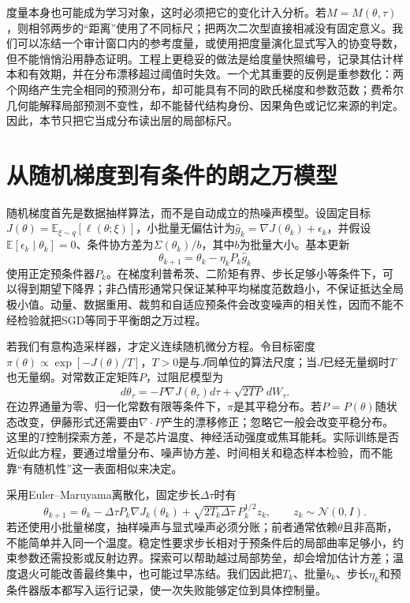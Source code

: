 度量本身也可能成为学习对象，这时必须把它的变化计入分析。若$M=M(\theta,\tau)$，则相邻两步的“距离”使用了不同标尺；把两次二次型直接相减没有固定意义。我们可以冻结一个审计窗口内的参考度量，或使用把度量演化显式写入的协变导数，但不能悄悄沿用静态证明。工程上更稳妥的做法是给度量快照编号，记录其估计样本和有效期，并在分布漂移超过阈值时失效。一个尤其重要的反例是重参数化：两个网络产生完全相同的预测分布，却可能具有不同的欧氏梯度和参数范数；费希尔几何能解释局部预测不变性，却不能替代结构身份、因果角色或记忆来源的判定。因此，本节只把它当成分布读出层的局部标尺。

\section{从随机梯度到有条件的朗之万模型}
\label{sec:statistical_physics_view}

随机梯度首先是数据抽样算法，而不是自动成立的热噪声模型。设固定目标$J(\theta)=\mathbb E_{\xi\sim q}[\ell(\theta;\xi)]$，小批量无偏估计为$\widehat g_k=\nabla J(\theta_k)+\epsilon_k$，并假设$\mathbb E[\epsilon_k\mid\theta_k]=0$、条件协方差为$\Sigma(\theta_k)/b$，其中$b$为批量大小。基本更新
\begin{equation}
\theta_{k+1}=\theta_k-\eta_k P_k\widehat g_k
\end{equation}
使用正定预条件器$P_k$。在梯度利普希茨、二阶矩有界、步长足够小等条件下，可以得到期望下降界；非凸情形通常只保证某种平均梯度范数趋小，不保证抵达全局极小值。动量、数据重用、裁剪和自适应预条件会改变噪声的相关性，因而不能不经检验就把SGD等同于平衡朗之万过程。

若我们有意构造采样器，才定义连续随机微分方程。令目标密度$\pi(\theta)\propto\exp[-J(\theta)/T]$，$T>0$是与$J$同单位的算法尺度；当$J$已经无量纲时$T$也无量纲。对常数正定矩阵$P$，过阻尼模型为
\begin{equation}
d\theta_\tau=-P\nabla J(\theta_\tau)d\tau+\sqrt{2TP}\,dW_\tau.
\end{equation}
在边界通量为零、归一化常数有限等条件下，$\pi$是其平稳分布。若$P=P(\theta)$随状态改变，伊藤形式还需要由$\nabla\!\cdot P$产生的漂移修正；忽略它一般会改变平稳分布。这里的$T$控制探索方差，不是芯片温度、神经活动强度或焦耳能耗。实际训练是否近似此方程，要通过增量分布、噪声协方差、时间相关和稳态样本检验，而不能靠“有随机性”这一表面相似来决定。

采用Euler--Maruyama离散化，固定步长$\Delta\tau$时有
\begin{equation}
\theta_{k+1}=\theta_k-\Delta\tau P_k\nabla J_k(\theta_k)
+\sqrt{2T_k\Delta\tau}\,P_k^{1/2}z_k,
\qquad z_k\sim\mathcal N(0,I).
\end{equation}
若还使用小批量梯度，抽样噪声与显式噪声必须分账；前者通常依赖$\theta$且非高斯，不能简单并入同一个温度。稳定性要求步长相对于预条件后的局部曲率足够小，约束参数还需投影或反射边界。探索可以帮助越过局部势垒，却会增加估计方差；温度退火可能改善最终集中，也可能过早冻结。我们因此把$T_k$、批量$b_k$、步长$\eta_k$和预条件器版本都写入运行记录，使一次失败能够定位到具体控制量。

